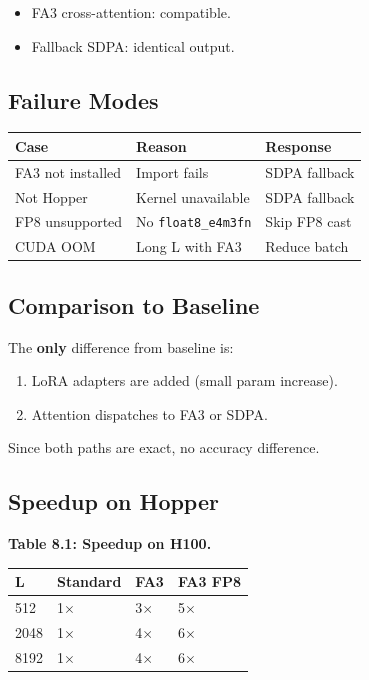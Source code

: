\begin{itemize}
\item FA3 cross-attention: compatible.
\item Fallback SDPA: identical output.

\end{itemize}
\subsection{Failure Modes}

\begin{table}[H]
\centering
\small
\begin{tabular}{lll}
\toprule
\textbf{Case} & \textbf{Reason} & \textbf{Response} \\
\midrule
FA3 not installed & Import fails & SDPA fallback \\
Not Hopper & Kernel unavailable & SDPA fallback \\
FP8 unsupported & No \texttt{float8\_e4m3fn} & Skip FP8 cast \\
CUDA OOM & Long L with FA3 & Reduce batch \\
\bottomrule
\end{tabular}
\end{table}

\subsection{Comparison to Baseline}

The \textbf{only} difference from baseline is:

\begin{enumerate}
\item LoRA adapters are added (small param increase).
\item Attention dispatches to FA3 or SDPA.

\end{enumerate}
Since both paths are exact, no accuracy difference.

\subsection{Speedup on Hopper}

\textbf{Table 8.1: Speedup on H100.}

\begin{table}[H]
\centering
\small
\begin{tabular}{llll}
\toprule
\textbf{L} & \textbf{Standard} & \textbf{FA3} & \textbf{FA3 FP8} \\
\midrule
512 & 1$\times$ & 3$\times$ & 5$\times$ \\
2048 & 1$\times$ & 4$\times$ & 6$\times$ \\
8192 & 1$\times$ & 4$\times$ & 6$\times$ \\
\bottomrule
\end{tabular}
\end{table}

